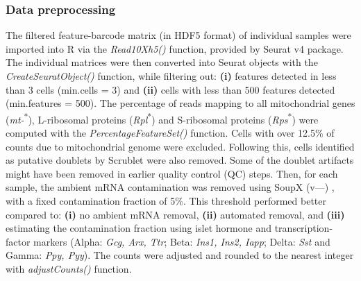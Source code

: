 \subsubsection{\large Data preprocessing}
The filtered feature-barcode matrix (in HDF5 format) of individual samples were imported into R via the \textit{Read10X\textunderscore h5()} function, provided by Seurat v4 \textbf{\cite{hao_integrated_2021}} package. The individual matrices were then converted into Seurat objects with the \textit{CreateSeuratObject()} function, while filtering out: \textbf{(i)} features detected in less than 3 cells (min.cells = 3) and \textbf{(ii)} cells with less than 500 features detected (min.features = 500). The percentage of reads mapping to all mitochondrial genes (\textit{mt-}\textsuperscript{*}), L-ribosomal proteins (\textit{Rpl}\textsuperscript{*}) and S-ribosomal proteins (\textit{Rps}\textsuperscript{*}) were computed with the \textit{PercentageFeatureSet()} function. Cells with over 12.5\% of counts due to mitochondrial genome were excluded. Following this, cells identified as putative doublets by Scrublet were also removed. Some of the doublet artifacts might have been removed in earlier quality control (QC) steps. Then, for each sample, the ambient mRNA contamination was removed using SoupX (v---) \textbf{\cite{young_soupx_2020}}, with a fixed contamination fraction of 5\%. This threshold performed better compared to: \textbf{(i)} no ambient mRNA removal, \textbf{(ii)} automated removal, and \textbf{(iii)} estimating the contamination fraction using islet hormone and transcription-factor markers (Alpha: \textit{Gcg, Arx, Ttr}; Beta: \textit{Ins1, Ins2, Iapp}; Delta: \textit{Sst} and Gamma: \textit{Ppy, Pyy}). The counts were adjusted and rounded to the nearest integer with \textit{adjustCounts()} function.  

